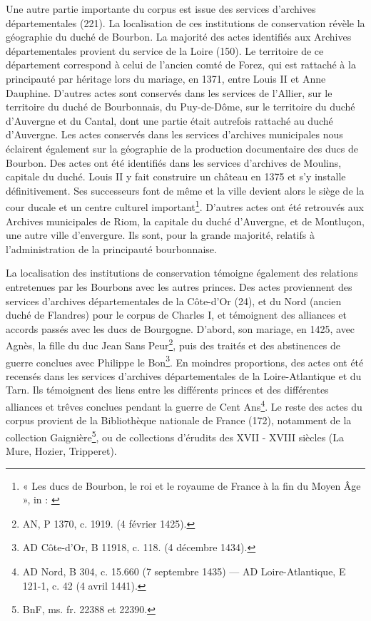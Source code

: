 \par Une autre partie importante du corpus est issue des services d'archives départementales (221). La localisation de ces institutions de conservation révèle la géographie du duché de Bourbon. La majorité des actes identifiés aux Archives départementales provient du service de la Loire (150). Le territoire de ce département correspond à celui de l’ancien comté de Forez, qui est rattaché à la principauté par héritage lors du mariage, en 1371, entre Louis II et Anne Dauphine. D'autres actes sont conservés dans les services de l'Allier, sur le territoire du duché de Bourbonnais, du Puy-de-Dôme, sur le territoire du duché d'Auvergne et du Cantal, dont une partie était autrefois rattaché au duché d'Auvergne. Les actes conservés dans les services d'archives municipales nous éclairent également sur la géographie de la production documentaire des ducs de Bourbon. Des actes ont été identifiés dans les services d'archives de Moulins, capitale du duché. Louis II y fait construire un château en 1375 et s'y installe définitivement. Ses successeurs font de même et la ville devient alors le siège de la cour ducale et un centre culturel important\footnote{« Les ducs de Bourbon, le roi et le royaume de France à la fin du Moyen Âge », in : \cite{matteoniBourbonsLeurBibliotheque2022}}. D'autres actes ont été retrouvés aux Archives municipales de Riom, la capitale du duché d'Auvergne, et de Montluçon, une autre ville d'envergure. Ils sont, pour la grande majorité, relatifs à l'administration de la principauté bourbonnaise. 
\newline 

\par La localisation des institutions de conservation témoigne également des relations entretenues par les Bourbons avec les autres princes. Des actes proviennent des services d'archives départementales de la Côte-d'Or (24), et du Nord (ancien duché de Flandres) pour le corpus de Charles I, et témoignent des alliances et accords passés avec les ducs de Bourgogne. D'abord, son mariage, en 1425, avec Agnès, la fille du duc Jean Sans Peur\footnote{AN, P 1370, c. 1919. (4 février 1425).}, puis des traités et des abstinences de guerre conclues avec Philippe le Bon\footnote{AD Côte-d’Or, B 11918, c. 118. (4 décembre 1434).}. En moindres proportions, des actes ont été recensés dans les services d'archives départementales de la Loire-Atlantique et du Tarn. Ils témoignent des liens entre les différents princes et des différentes alliances et trêves conclues pendant la guerre de Cent Ans\footnote{AD Nord, B 304, c. 15.660 (7 septembre 1435) — AD Loire-Atlantique, E 121-1, c. 42 (4 avril 1441).}. Le reste des actes du corpus provient de la Bibliothèque nationale de France (172), notamment de la collection Gaignière\footnote{BnF, ms. fr. 22388 et 22390.}, ou de collections d'érudits des \textsc{XVII} - \textsc{XVIII} siècles (La Mure, Hozier, Tripperet). 


